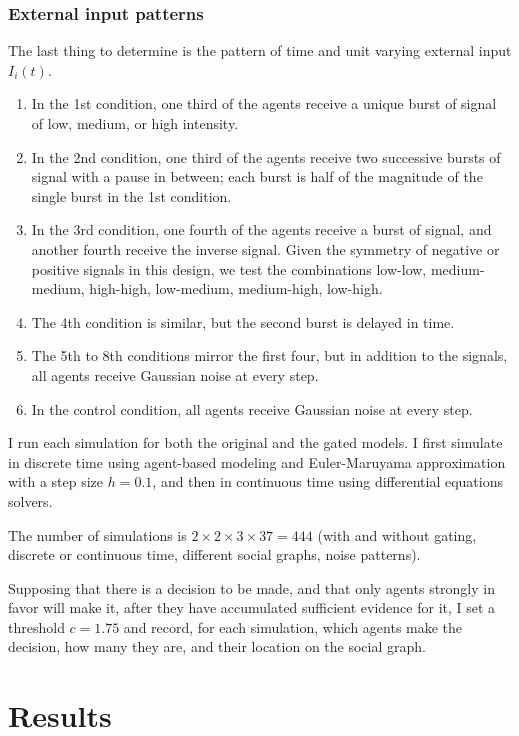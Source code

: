 \documentclass[]{article}
\begin{document}
\subsubsection{External input patterns}
The last thing to determine is the pattern of time and unit varying external input $I_i(t)$. 
\begin{enumerate}
	\item In the 1st condition, one third of the agents receive a unique burst of signal of low, medium, or high intensity. 
	\item In the 2nd condition, one third of the agents receive two successive bursts of signal with a pause in between; each burst is half of the magnitude of the single burst in the 1st condition.
	\item In the 3rd condition, one fourth of the agents receive a burst of signal, and another fourth receive the inverse signal. Given the symmetry of negative or positive signals in this design, we test the combinations low-low, medium-medium, high-high, low-medium, medium-high, low-high. 
	\item The 4th condition is similar, but the second burst is delayed in time.
	\item The 5th to 8th conditions mirror the first four, but in addition to the signals, all agents receive Gaussian noise at every step.
	\item In the control condition, all agents receive Gaussian noise at every step.
\end{enumerate}

I run each simulation for both the original and the gated models. I first simulate in discrete time using agent-based modeling and Euler-Maruyama approximation with a step size $h = 0.1$, and then in continuous time using differential equations solvers.

The number of simulations is $2 \times 2 \times 3 \times 37 = 444$ (with and without gating, discrete or continuous time, different social graphs, noise patterns).

Supposing that there is a decision to be made, and that only agents strongly in favor will make it, after they have accumulated sufficient evidence for it, I set a threshold $c = 1.75$ and record, for each simulation, which agents make the decision, how many they are, and their location on the social graph.


\section{Results}
\end{document}
